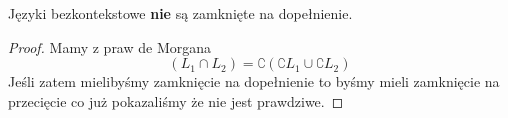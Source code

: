 \begin{theorem}
	Języki bezkontekstowe \textbf{nie} są zamknięte na dopełnienie.
\end{theorem}
\begin{proof}
	Mamy z praw de Morgana
	\[
		(L_1 \cap L_2) = \complement{(\complement{L_1} \cup \complement{L_2})}
	\]
	Jeśli zatem mielibyśmy zamknięcie na dopełnienie to byśmy mieli zamknięcie na przecięcie co już pokazaliśmy że nie jest prawdziwe.
\end{proof}